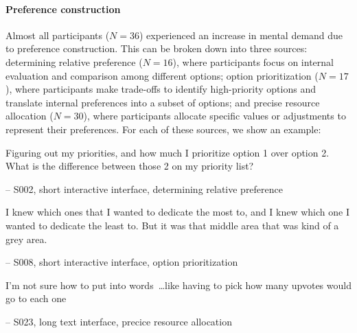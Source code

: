 \paragraph{Preference construction} Almost all participants ($N=36$) experienced an increase in mental demand due to preference construction. This can be broken down into three sources: determining relative preference ($N=16$), where participants focus on internal evaluation and comparison among different options; option prioritization ($N=17$),  where participants make trade-offs to identify high-priority options and translate internal preferences into a subset of options; and precise resource allocation ($N=30$), where participants allocate specific values or adjustments to represent their preferences. For each of these sources, we show an example:

\begin{displayquote}
Figuring out my priorities, and how much I prioritize option 1 over option 2. What is the difference between those 2 on my priority list?

\hfill -- S002, short interactive interface, determining relative preference
\end{displayquote}


\begin{displayquote}
I knew which ones that I wanted to dedicate the most to, and I knew which one I wanted to dedicate the least to. But it was that middle area that was kind of a grey area.
    
\noindent \hfill -- S008, short interactive interface, option prioritization
\end{displayquote}


\begin{displayquote}
I'm not sure how to put into words~\ldots like having to pick how many upvotes would go to each one
    
\noindent \hfill -- S023, long text interface, precice resource allocation
\end{displayquote}

